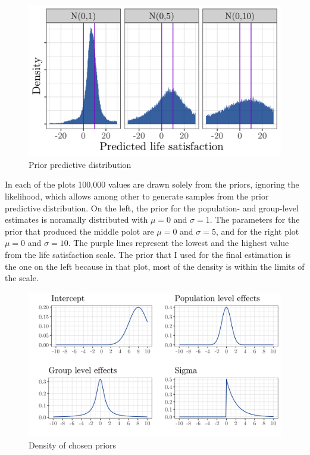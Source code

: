 \documentclass[a4, 12pt]{article}
\begin{document}
\begin{figure}[H]

{\centering \includegraphics[width=0.8\linewidth,]{../figures/prior_predict} 

}

\caption{Prior predictive distribution}\label{fig:lsat-predicted}
\end{figure}

In each of the plots 100,000 values are drawn solely from the priors, ignoring the likelihood, which allows among other to generate samples from the prior predictive distribution. On the left, the prior for the population- and group-level estimates is noramally distributed with \(\mu=0\) and \(\sigma=1\). The parameters for the prior that produced the middle polot are \(\mu=0\) and \(\sigma=5\), and for the right plot \(\mu=0\) and \(\sigma=10\). The purple lines represent the lowest and the highest value from the life satisfaction scale. The prior that I used for the final estimation is the one on the left because in that plot, most of the density is within the limits of the scale.

\begin{figure}[H]

{\centering \includegraphics[width=0.8\linewidth,]{../figures/plot_priors} 

}

\caption{Density of chosen priors}\label{fig:chosen-priors}
\end{figure}
\end{document}
